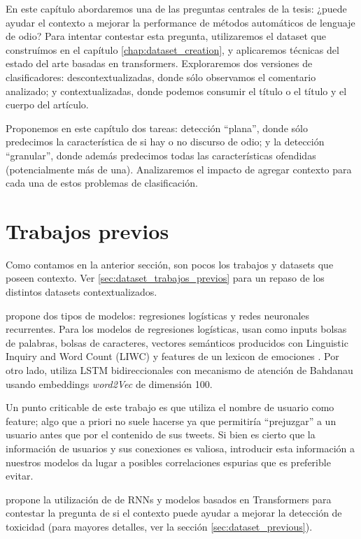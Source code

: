 
En este capítulo abordaremos una de las preguntas centrales de la tesis: ¿puede ayudar el contexto a mejorar la performance de métodos automáticos de lenguaje de odio? Para intentar contestar esta pregunta, utilizaremos el dataset que construímos en el capítulo \ref{chap:dataset_creation}, y aplicaremos técnicas del estado del arte basadas en transformers. Exploraremos dos versiones de clasificadores: descontextualizadas, donde sólo observamos el comentario analizado; y contextualizadas, donde podemos consumir el título o el título y el cuerpo del artículo.

Proponemos en este capítulo dos tareas: detección ``plana'', donde sólo predecimos la característica de si hay o no discurso de odio; y la detección ``granular'', donde además predecimos todas las características ofendidas (potencialmente más de una). Analizaremos el impacto de agregar contexto para cada una de estos problemas de clasificación.


\section{Trabajos previos}

Como contamos en la anterior sección, son pocos los trabajos y datasets que poseen contexto. Ver \ref{sec:dataset_trabajos_previos} para un repaso de los distintos datasets contextualizados.

\citet{gao-huang-2017-detecting} propone dos tipos de modelos: regresiones logísticas y redes neuronales recurrentes. Para los modelos de regresiones logísticas, usan como inputs bolsas de palabras, bolsas de caracteres, vectores semánticos producidos con Linguistic Inquiry and Word Count (LIWC) \cite{pennebaker2001linguistic} y features de un lexicon de emociones \cite{mohammad2013nrc}. Por otro lado, utiliza LSTM bidireccionales con mecanismo de atención de Bahdanau \cite{bahdanau2014neural} usando embeddings \emph{word2Vec} de dimensión 100.

Un punto criticable de este trabajo es que utiliza el nombre de usuario como feature; algo que a priori no suele hacerse ya que permitiría ``prejuzgar'' a un usuario antes que por el contenido de sus tweets. Si bien es cierto que la información de usuarios y sus conexiones es valiosa, introducir esta información a nuestros modelos da lugar a posibles correlaciones espurias que es preferible evitar.

\citet{pavlopoulos2020toxicity} propone la utilización de de RNNs y modelos basados en Transformers para contestar la pregunta de si el contexto puede ayudar a mejorar la detección de toxicidad (para mayores detalles, ver la sección \ref{sec:dataset_previous}).

